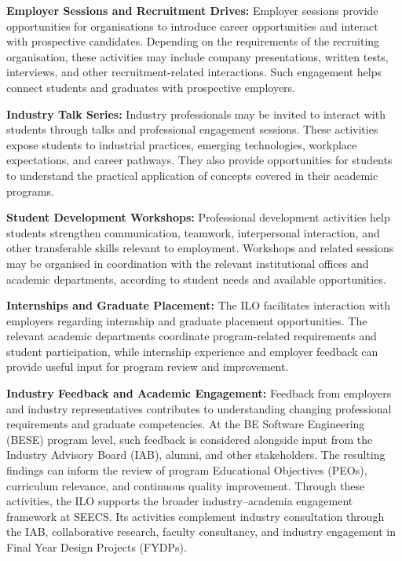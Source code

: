 \textbf{Employer Sessions and Recruitment Drives:}
Employer sessions provide opportunities for organisations to
introduce career opportunities and interact with prospective
candidates. Depending on the requirements of the recruiting
organisation, these activities may include company presentations,
written tests, interviews, and other recruitment-related
interactions. Such engagement helps connect students and graduates
with prospective employers.

\textbf{Industry Talk Series:}
Industry professionals may be invited to interact with students
through talks and professional engagement sessions. These
activities expose students to industrial practices, emerging
technologies, workplace expectations, and career pathways.
They also provide opportunities for students to understand the
practical application of concepts covered in their academic
programs.

\textbf{Student Development Workshops:}
Professional development activities help students strengthen
communication, teamwork, interpersonal interaction, and other
transferable skills relevant to employment. Workshops and related
sessions may be organised in coordination with the relevant
institutional offices and academic departments, according to
student needs and available opportunities.

\textbf{Internships and Graduate Placement:}
The ILO facilitates interaction with employers regarding internship
and graduate placement opportunities. The relevant academic
departments coordinate program-related requirements and student
participation, while internship experience and employer feedback
can provide useful input for program review and improvement.

\textbf{Industry Feedback and Academic Engagement:}
Feedback from employers and industry representatives contributes
to understanding changing professional requirements and graduate
competencies. At the BE Software Engineering (BESE) program
level, such feedback is considered alongside input from the
Industry Advisory Board (IAB), alumni, and other stakeholders.
The resulting findings can inform the review of program
Educational Objectives (PEOs), curriculum relevance, and
continuous quality improvement. Through these activities, the ILO supports the broader
industry--academia engagement framework at SEECS. Its activities
complement industry consultation through the IAB, collaborative
research, faculty consultancy, and industry engagement in Final
Year Design Projects (FYDPs). 

